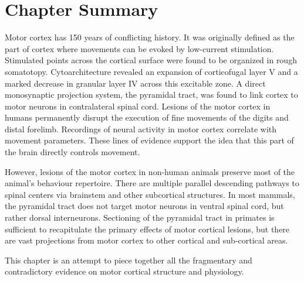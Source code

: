 				
\section{Chapter Summary}

Motor cortex has 150 years of conflicting history. It was originally defined as the part of cortex where movements can be evoked by low-current stimulation. Stimulated points across the cortical surface were found to be organized in rough somatotopy. Cytoarchitecture revealed an expansion of corticofugal layer V and a marked decrease in granular layer IV across this excitable zone. A direct monosynaptic projection system, the pyramidal tract, was found to link cortex to motor neurons in contralateral spinal cord. Lesions of the motor cortex in humans permanently disrupt the execution of fine movements of the digits and distal forelimb. Recordings of neural activity in motor cortex correlate with movement parameters. These lines of evidence support the idea that this part of the brain directly controls movement.

However, lesions of the motor cortex in non-human animals preserve most of the animal's behaviour repertoire. There are multiple parallel descending pathways to spinal centers via brainstem and other subcortical structures. In most mammals, the pyramidal tract does not target motor neurons in ventral spinal cord, but rather dorsal interneurons. Sectioning of the pyramidal tract in primates is sufficient to recapitulate the primary effects of motor cortical lesions, but there are vast projections from motor cortex to other cortical and sub-cortical areas.

This chapter is an attempt to piece together all the fragmentary and contradictory evidence on motor cortical structure and physiology.

\pagebreak



